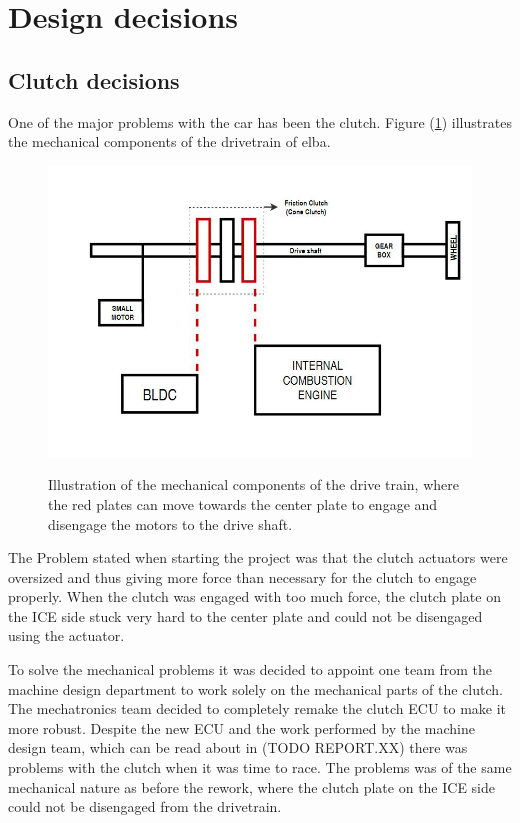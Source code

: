 \section{Design decisions}
\subsection{Clutch decisions}

One of the major problems with the car has been the clutch. Figure (\ref{fig:Drivetrain}) illustrates the mechanical components of the drivetrain of elba.

\begin{figure}[H]
    \centering\label{fig:Drivetrain}
    \includegraphics[width=1\textwidth]{./img/Drivetrain}
    \caption{Illustration of the mechanical components of the drive train, where the red plates can move towards the center plate to engage and disengage the motors to the drive shaft.}
\end{figure}

The Problem stated when starting the project was that the clutch actuators were
oversized and thus giving more force than necessary for the clutch to engage
properly. When the clutch was engaged with too much force, the clutch plate on
the ICE side stuck very hard to the center plate and could not be disengaged
using the actuator.

To solve the mechanical problems it was decided to appoint one team from the
machine design department to work solely on the mechanical parts of the clutch.
The mechatronics team decided to completely remake the clutch ECU to make it
more robust. Despite the new ECU and the work performed by the machine design
team, which can be read about in (TODO REPORT.XX) there was problems with the
clutch when it was time to race. The problems was of the same mechanical nature
as before the rework, where the clutch plate on the ICE side could not be
disengaged from the drivetrain.

